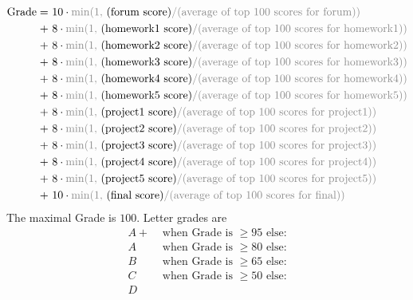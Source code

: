 \documentclass[12pt]{article}
\begin{document}
        \begin{align*}
          \text{Grade} =
               ~&10 \cdot {\gre \min(1,~} ( \text{forum score}     ) {\gre / ( \text{average of top $100$ scores for forum}       ))}
            \\+~& 8 \cdot {\gre \min(1,~} ( \text{homework1 score} ) {\gre / ( \text{average of top $100$ scores for homework1}   ))}
            \\+~& 8 \cdot {\gre \min(1,~} ( \text{homework2 score} ) {\gre / ( \text{average of top $100$ scores for homework2}   ))}
            \\+~& 8 \cdot {\gre \min(1,~} ( \text{homework3 score} ) {\gre / ( \text{average of top $100$ scores for homework3}   ))}
            \\+~& 8 \cdot {\gre \min(1,~} ( \text{homework4 score} ) {\gre / ( \text{average of top $100$ scores for homework4}   ))}
            \\+~& 8 \cdot {\gre \min(1,~} ( \text{homework5 score} ) {\gre / ( \text{average of top $100$ scores for homework5}   ))}
            \\+~& 8 \cdot {\gre \min(1,~} ( \text{project1 score}  ) {\gre / ( \text{average of top $100$ scores for project1}    ))}
            \\+~& 8 \cdot {\gre \min(1,~} ( \text{project2 score}  ) {\gre / ( \text{average of top $100$ scores for project2}    ))}
            \\+~& 8 \cdot {\gre \min(1,~} ( \text{project3 score}  ) {\gre / ( \text{average of top $100$ scores for project3}    ))}
            \\+~& 8 \cdot {\gre \min(1,~} ( \text{project4 score}  ) {\gre / ( \text{average of top $100$ scores for project4}    ))}
            \\+~& 8 \cdot {\gre \min(1,~} ( \text{project5 score}  ) {\gre / ( \text{average of top $100$ scores for project5}    ))}
            \\+~&10 \cdot {\gre \min(1,~} ( \text{final score}     ) {\gre / ( \text{average of top $100$ scores for final}       ))}
        \end{align*}
        The maximal Grade is $100$.
        Letter grades are
        \begin{align*}
          A+ & \text{~when Grade is $\geq 95$ else:}\\
          A  & \text{~when Grade is $\geq 80$ else:}\\
          B  & \text{~when Grade is $\geq 65$ else:}\\
          C  & \text{~when Grade is $\geq 50$ else:}\\
          D  & \text{~}
        \end{align*}
\end{document}
